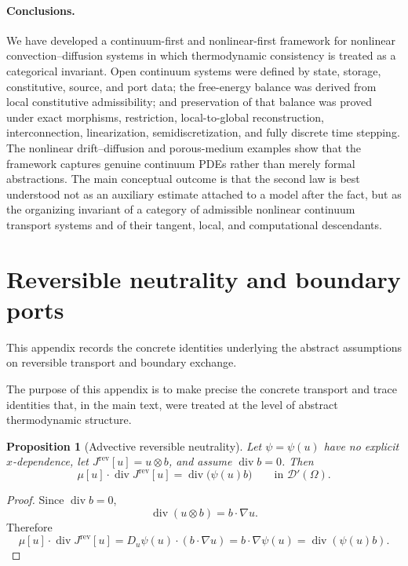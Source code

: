 \documentclass[11pt]{article}
\newtheorem{proposition}[theorem]{Proposition}
\newcommand{\Om}{\Omega}
\newcommand{\grad}{\nabla}
\newcommand{\diver}{\operatorname{div}}
\begin{document}
\paragraph{Conclusions.}
We have developed a continuum-first and nonlinear-first framework for nonlinear
convection--diffusion systems in which thermodynamic consistency is treated as a
categorical invariant. Open continuum systems were defined by state, storage,
constitutive, source, and port data; the free-energy balance was derived from local
constitutive admissibility; and preservation of that balance was proved under exact
morphisms, restriction, local-to-global reconstruction, interconnection,
linearization, semidiscretization, and fully discrete time stepping. The nonlinear
drift--diffusion and porous-medium examples show that the framework captures genuine
continuum PDEs rather than merely formal abstractions. The main conceptual outcome is
that the second law is best understood not as an auxiliary estimate attached to a
model after the fact, but as the organizing invariant of a category of admissible
nonlinear continuum transport systems and of their tangent, local, and computational
descendants.

\appendix

\section{Reversible neutrality and boundary ports}

This appendix records the concrete identities underlying the abstract assumptions on
reversible transport and boundary exchange.

The purpose of this appendix is to make precise the concrete transport and trace
identities that, in the main text, were treated at the level of abstract
thermodynamic structure.

\begin{proposition}[Advective reversible neutrality]\label{prop:advective}
Let \(\psi=\psi(u)\) have no explicit \(x\)-dependence, let
\(J^{\mathrm{rev}}[u]=u\otimes b\), and assume \(\diver b=0\). Then
\begin{equation}\label{eq:advective-neutral}
\mu[u]\cdot \diver J^{\mathrm{rev}}[u]
=
\diver\bigl(\psi(u)b\bigr)
\qquad \text{in }\mathscr{D}'(\Om).
\end{equation}
\end{proposition}

\begin{proof}
Since \(\diver b=0\),
\[
\diver(u\otimes b)=b\cdot \grad u.
\]
Therefore
\[
\mu[u]\cdot \diver J^{\mathrm{rev}}[u]
=
D_u\psi(u)\cdot (b\cdot \grad u)
=
b\cdot \grad \psi(u)
=
\diver(\psi(u)b).
\]
\end{proof}
\end{document}
